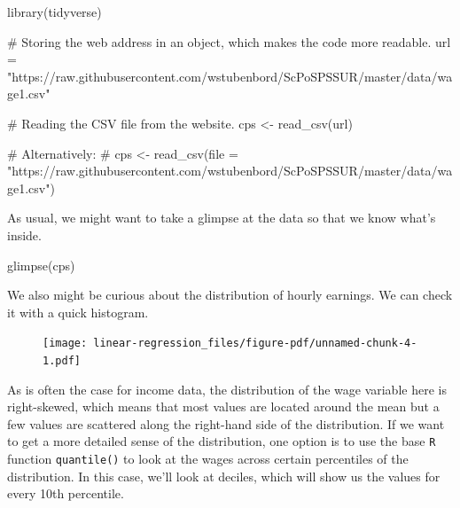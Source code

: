 \documentclass[
  letterpaper,
]{book}
\newenvironment{Shaded}{\begin{snugshade}}{\end{snugshade}}
\newcommand{\CommentTok}[1]{\textcolor[rgb]{0.37,0.37,0.37}{#1}}
\newcommand{\FunctionTok}[1]{\textcolor[rgb]{0.28,0.35,0.67}{#1}}
\newcommand{\NormalTok}[1]{\textcolor[rgb]{0.00,0.23,0.31}{#1}}
\newcommand{\OtherTok}[1]{\textcolor[rgb]{0.00,0.23,0.31}{#1}}
\newcommand{\SpecialCharTok}[1]{\textcolor[rgb]{0.37,0.37,0.37}{#1}}
\newcommand{\StringTok}[1]{\textcolor[rgb]{0.13,0.47,0.30}{#1}}
\begin{document}
\begin{Shaded}
\begin{Highlighting}[]
\FunctionTok{library}\NormalTok{(tidyverse)}
\end{Highlighting}
\end{Shaded}

\begin{Shaded}
\begin{Highlighting}[]
\CommentTok{\# Storing the web address in an object, which makes the code more readable.}
\NormalTok{url }\OtherTok{=} \StringTok{"https://raw.githubusercontent.com/wstubenbord/ScPoSPSSUR/master/data/wage1.csv"}

\CommentTok{\# Reading the CSV file from the website.}
\NormalTok{cps }\OtherTok{\textless{}{-}} \FunctionTok{read\_csv}\NormalTok{(url)}

\CommentTok{\# Alternatively:}
\CommentTok{\# cps \textless{}{-} read\_csv(file = "https://raw.githubusercontent.com/wstubenbord/ScPoSPSSUR/master/data/wage1.csv")}
\end{Highlighting}
\end{Shaded}

As usual, we might want to take a glimpse at the data so that we know
what's inside.

\begin{Shaded}
\begin{Highlighting}[]
\FunctionTok{glimpse}\NormalTok{(cps)}
\end{Highlighting}
\end{Shaded}

We also might be curious about the distribution of hourly earnings. We
can check it with a quick histogram.

\begin{Shaded}
\end{Shaded}

\begin{figure}[H]

{\centering \texttt{[image: linear-regression\_files/figure-pdf/unnamed-chunk-4-1.pdf]}

}

\end{figure}

As is often the case for income data, the distribution of the wage
variable here is right-skewed, which means that most values are located
around the mean but a few values are scattered along the right-hand side
of the distribution. If we want to get a more detailed sense of the
distribution, one option is to use the base \texttt{R} function
\texttt{quantile()} to look at the wages across certain percentiles of
the distribution. In this case, we'll look at deciles, which will show
us the values for every 10th percentile.
\end{document}
